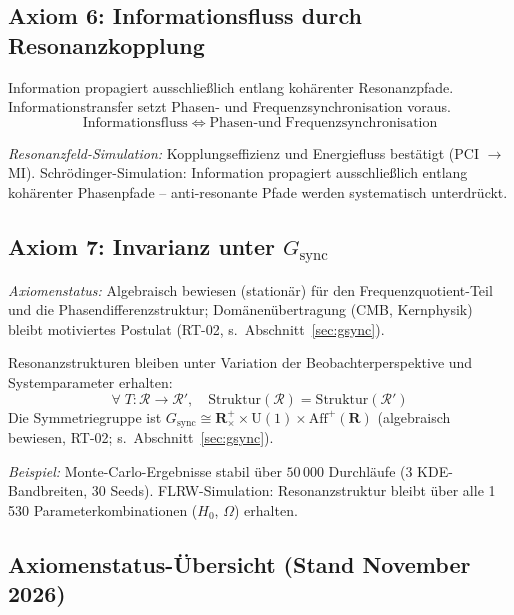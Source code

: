 \documentclass[12pt]{iopart}
\providecommand{\mathbb}[1]{\mathbf{#1}}
\begin{document}
	\subsection{Axiom 6: Informationsfluss durch
		Resonanzkopplung}
	
	Information propagiert ausschlie\ss{}lich entlang
	koh\"arenter Resonanzpfade. Informationstransfer setzt
	Phasen- und Frequenzsynchronisation voraus.
	\begin{equation}
		\mathrm{Informationsfluss} \iff
		\mathrm{Phasen\textrm{-} und\;Frequenzsynchronisation}
		\label{eq:information}
	\end{equation}
	
	\textit{Resonanzfeld-Simulation:} Kopplungseffizienz
	und Energiefluss best\"atigt (PCI $\to$ MI).
	Schr\"odinger-Simulation: Information propagiert
	ausschlie\ss{}lich entlang koh\"arenter Phasenpfade --
	anti-resonante Pfade werden systematisch unterdr\"uckt.
	
	\subsection{Axiom 7: Invarianz unter $G_{\mathrm{sync}}$}
	
	\textit{Axiomenstatus:} Algebraisch bewiesen (stationär)
	f\"ur den Frequenzquotient-Teil und die Phasendifferenzstruktur;
	Dom\"anen\"ubertragung (CMB, Kernphysik) bleibt
	motiviertes Postulat (RT-02, s.~Abschnitt~\ref{sec:gsync}).
	
	Resonanzstrukturen bleiben unter Variation der
	Beobachterperspektive und Systemparameter erhalten:
	\begin{equation}
		\forall\; T : \mathcal{R} \to \mathcal{R}', \quad
		\mathrm{Struktur}(\mathcal{R})
		= \mathrm{Struktur}(\mathcal{R}')
		\label{eq:invariance}
	\end{equation}
	Die Symmetriegruppe ist
	$G_{\mathrm{sync}} \cong \mathbb{R}^+_\times \times \mathrm{U}(1)
	\times \mathrm{Aff}^+(\mathbb{R})$ (algebraisch bewiesen,
	RT-02; s.~Abschnitt~\ref{sec:gsync}).
	
	\textit{Beispiel:} Monte-Carlo-Ergebnisse stabil \"uber
	$50\,000$ Durchl\"aufe (3 KDE-Bandbreiten, 30 Seeds).
	FLRW-Simulation: Resonanzstruktur bleibt \"uber alle
	1\,530 Parameterkombinationen ($H_0$, $\Omega$) erhalten.
	
	\subsection{Axiomenstatus-\"Ubersicht (Stand November 2026)}
	\label{sec:axiom_status}
	
\end{document}
